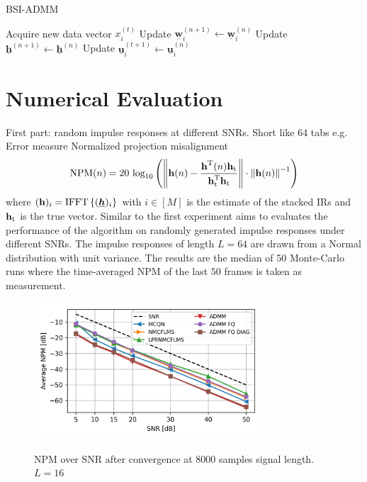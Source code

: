 \documentclass{article}
\newcommand{\h}{\mtxb{h}}
\newcommand{\hf}{\underline{\bm{h}}}
\newcommand{\wf}{\underline{\bm{w}}}
\newcommand{\uuf}{\underline{\bm{u}}}
\begin{document}
\begin{algorithm}
    \caption{BSI-ADMM}\label{alg:bsi_admm}
    \begin{algorithmic}
                \State Acquire new data vector \(x_i^{(t)}\)
                \State Update \(\wf_i^{(n+1)} \leftarrow \wf_i^{(n)}\)
            \EndFor
            \State Update \(\hf^{(n+1)} \leftarrow \hf^{(n)}\)
                \State Update \(\uuf_i^{(t+1)} \leftarrow \uuf_i^{(n)}\)
            \EndFor
        \EndFor
    \end{algorithmic}
\end{algorithm}

\section{Numerical Evaluation}
\label{sec:perf_eval}

First part: random impulse responses at different SNRs. Short like 64 tabs e.g.
Error measure Normalized projection misalignment
\begin{equation}
    \text{NPM}(n) = 20\,\log_{10} \left(\left\| \h(n) - \frac{\h^\T (n) \h_{\text{t}}}{\h_{\text{t}}^\T \h_{\text{t}}} \right\| \cdot \left\|\h(n)\right\|^{-1}\right)
\end{equation}
where \((\h)_i = \operatorname{IFFT} \left\{ (\hf)_i \right\}\) with \(i \in [M]\) is the estimate of the stacked IRs and \(\h_{\text{t}}\) is the true vector.
Similar to \cite{} the first experiment aims to evaluates the performance of the algorithm on randomly generated impulse responses under different SNRs.
The impulse responses of length \(L=64\) are drawn from a Normal distribution with unit variance.
The results are the median of 50 Monte-Carlo runs where the time-averaged NPM of the last \(50\) frames is taken as measurement.

\begin{figure}
    \centering
    \includegraphics[width=8.5cm]{images/NPM_over_SNR.png}\label{fig:perf_eval:NPM_over_SNR}
    \caption{NPM over SNR after convergence at 8000 samples signal length. \(L=16\)}
\end{figure}
\end{document}
